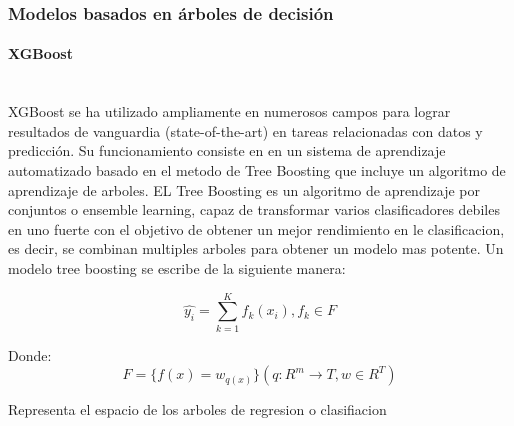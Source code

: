 \subsubsection{Modelos basados en árboles de decisión}
    \paragraph{XGBoost}\mbox{}\\
    XGBoost se ha utilizado ampliamente en numerosos campos para lograr resultados de vanguardia (state-of-the-art) en tareas relacionadas con datos y predicción. Su funcionamiento consiste en en un sistema de aprendizaje automatizado basado en el metodo de Tree Boosting que incluye un algoritmo de aprendizaje de arboles. EL Tree Boosting es un algoritmo de aprendizaje por conjuntos o ensemble learning, capaz de transformar varios clasificadores debiles en uno fuerte con el objetivo de obtener un mejor rendimiento en le clasificacion, es decir, se combinan multiples arboles para obtener un modelo mas potente. Un modelo tree boosting se escribe de la siguiente manera\cite{ren2017novel}:

    \begin{equation}
        \hat{y_i} = \sum_{k=1}^{K} f_k(x_i), f_k \in F
    \end{equation}
    
    Donde:
    \begin{equation}
        F = \{f(x) = w_{q(x)}\} (q: R^m \rightarrow T, w \in R^T)
    \end{equation}
    
    Representa el espacio de los arboles de regresion o clasifiacion